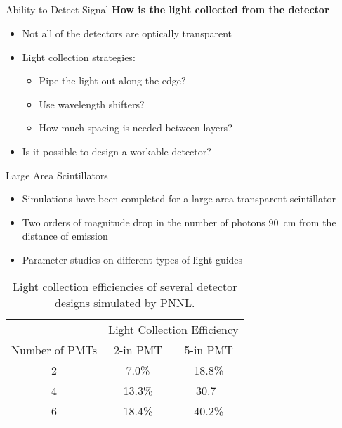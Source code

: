 \subsection*{}
\begin{frame}{Ability to Detect Signal}
  \textbf{How is the light collected from the detector}
  \vspace{1cm}
  \begin{itemize}
    \item Not all of the detectors are optically transparent
    \item Light collection strategies:
    \begin{itemize}
      \item Pipe the light out along the edge?
      \item Use wavelength shifters?
      \item How much spacing is needed between layers?
    \end{itemize}
    \item Is it possible to design a workable detector?
  \end{itemize}
\end{frame}
\begin{frame}[fragile]{Large Area Scintillators}
\begin{itemize}
  \item Simulations have been completed for a large area transparent scintillator
  \item Two orders of magnitude drop in the number of photons \SI{90}{\cm} from the distance of emission\cite{riggi_introducing_2011}
  \item Parameter studies on different types of light guides
\end{itemize}
\begin{table}
  \centering
  \caption[PNNL Light Collection Efficiencies]{Light collection efficiencies of several detector designs simulated by PNNL\cite{pnnl_14283}.}
  \label{tab:PNNLLightCollectionEfficiency}
  \begin{tabular}{c|c c}
  \toprule
  & \multicolumn{2}{c}{Light Collection Efficiency} \\
  Number of PMTs  & 2-in PMT & 5-in PMT \\
  \midrule
  2 & 7.0\% & 18.8\% \\
  4 & 13.3\% & 30.7\ \\
  6 & 18.4\% & 40.2\% \\
  \bottomrule
  \end{tabular}
\end{table}
\end{frame}
